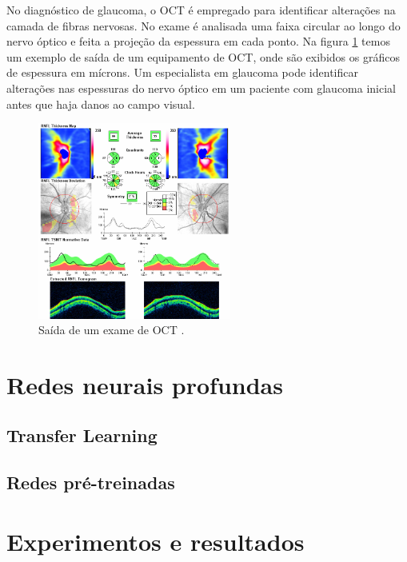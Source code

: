 \documentclass[conference]{IEEEtran}
\begin{document}
No diagnóstico de glaucoma, o OCT é empregado para identificar alterações na camada de fibras nervosas. No exame é analisada uma faixa circular ao longo do nervo óptico e feita a projeção da espessura em cada ponto. Na figura \ref{fig:oct} temos um exemplo de saída de um equipamento de OCT, onde são exibidos os gráficos de espessura em mícrons. Um especialista em glaucoma pode identificar alterações nas espessuras do nervo óptico em um paciente com glaucoma inicial antes que haja danos ao campo visual. 

\begin{figure}[!tp]
  \centering
  \includegraphics[width=2.5in]{img/oct.png}
  \caption{Saída de um exame de OCT \cite{Populacoes2009}.}
  \label{fig:oct}
\end{figure}

\section{Redes neurais profundas}




  \subsection{Transfer Learning}


  \subsection{Redes pré-treinadas}


\section{Experimentos e resultados}
\end{document}
